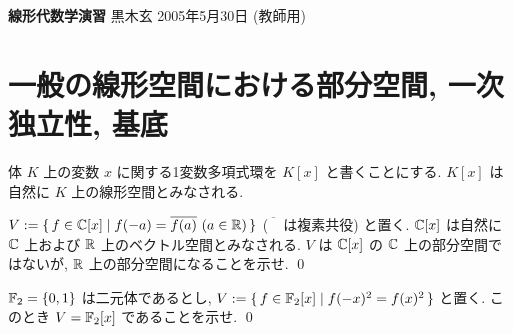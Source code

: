 \documentclass[12pt,twoside]{jarticle}
\newcommand\commentout[1]{#1}
\newcommand\commentout[1]{}
\begin{document}

%
%



\noindent
{\Large\bf 線形代数学演習}
\hfill
{\large 黒木玄}
\qquad
2005年5月30日
\commentout{\quad (教師用)}


\tableofcontents


\section{一般の線形空間における部分空間, 一次独立性, 基底}

体 $K$ 上の変数 $x$ に関する1変数多項式環を $K[x]$ と書くことにする.
$K[x]$ は自然に $K$ 上の線形空間とみなされる.

\begin{question}[5点]
  $V := \{\, f\in{\mathbb C}[x] \mid f(-a)=\overline{f(a)}\ (a\in{\mathbb R}) \,\}$ %
  ($\overline{\phantom{A}}$ は複素共役) と置く.
  ${\mathbb C}[x]$ は自然に ${\mathbb C}$ 上および ${\mathbb R}$ 上のベクトル空間とみなされる.
  $V$ は ${\mathbb C}[x]$ の ${\mathbb C}$ 上の部分空間ではないが, %
  ${\mathbb R}$ 上の部分空間になることを示せ.
  \qed
\end{question}

\begin{question}[5点]
  ${\mathbb F}_2=\{0,1\}$ は二元体であるとし, %
  $V:=\{\, f\in{\mathbb F}_2[x] \mid f(-x)^2=f(x)^2\,\}$ と置く.
  このとき $V={\mathbb F}_2[x]$ であることを示せ.
  \qed
\end{question}
\end{document}
